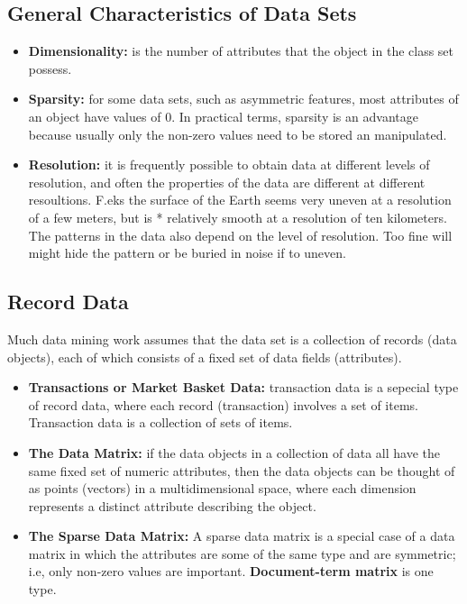 		\subsection*{General Characteristics of Data Sets}
			\begin{itemize}
				\item {\bf Dimensionality:} is the number of attributes that the object in the 
				class set possess.
				\item {\bf Sparsity:} for some data sets, such as asymmetric features, most
				attributes of an object have values of 0. In practical terms, sparsity is an advantage
				because usually only the non-zero values need to be stored an manipulated. 
				\item {\bf Resolution:} it is frequently possible to obtain data at different levels of
				resolution, and often the properties of the data are different at different resoultions.
				F.eks the surface of the Earth seems very uneven at a resolution of a few meters, but is *
				relatively smooth at a resolution of ten kilometers. The patterns in the data also depend
				on the level of resolution. Too fine will might hide the pattern or be buried in noise if
				to uneven. 
			\end{itemize}


		\clearpage
		\subsection*{Record Data}
		Much data mining work assumes that the data set is a collection of records (data objects), each of which consists of a fixed set of data fields (attributes).
			\begin{itemize}
				\item {\bf Transactions or Market Basket Data:} transaction data is a sepecial type of record
				data, where each record (transaction) involves a set of items. Transaction data is a collection
				of sets of items. 
				\item {\bf The Data Matrix:} if the data objects in a collection of data all have the
				same fixed set of numeric attributes, then the data objects can be thought of as points
				(vectors) in a multidimensional space, where each dimension represents a distinct attribute
				describing the object. 
				\item {\bf The Sparse Data Matrix:} A sparse data matrix is a special case of a data matrix in
				which the attributes are some of the same type and are symmetric; i.e, only non-zero values
				are important. {\bf Document-term matrix } is one type. 
			\end{itemize}

